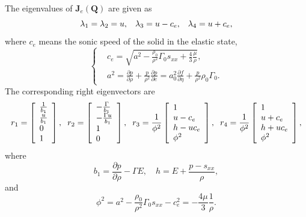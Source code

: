\documentclass{article}
\numberwithin{equation}{section}
\numberwithin{table}{section}
\begin{document}
The eigenvalues of $\mathbf{J}_{e}(\mathbf{Q})$ are given as
\begin{equation}
  \lambda_1 =\lambda_2 = u, \hspace{0.3cm} \lambda_3 = u-c_{e}, \hspace{0.3cm} \lambda_4 = u+c_{e},
\end{equation}
where $c_e$ means the sonic speed of the solid in the elastic state,
\begin{equation}\label{eq:c_e}
  \left\{ \begin{aligned}
      & c_e = \sqrt{a^2-\frac{\rho_0}{\rho^2}\Gamma_0 s_{xx} +\frac{4}{3}\frac{\mu}{\rho}},\\
    &   a^2 = \frac{\partial p}{\partial \rho} + \frac{p}{\rho^2}\frac{\partial p}{\partial e} = a^2_0 \frac{\partial f}{\partial \eta} + \frac{p}{\rho^2}\rho_0 \Gamma_0.
      \end{aligned} \right.
    \end{equation}
The corresponding right eigenvectors are
\begin{equation}\label{eq:eiv}
  r_1 = \left[ \begin{array}{l}
      \frac{1}{b_1} \\
      \frac{u}{b_1} \\
      0 \\
      1 \\
    \end{array}
    \right], \hspace{0.2cm}
    r_2= \left[ \begin{array}{l}
        -\frac{\Gamma}{b_1} \\
        -\frac{\Gamma u}{b_1} \\
        1 \\
        0\\
      \end{array}
    \right], \hspace{0.2cm}
r_3 =   \frac{1}{\phi^2}\left[\begin{array}{l}
        1 \\
        u-c_e \\
        h -uc_e \\
        \phi^2
      \end{array}
    \right], \hspace{0.2cm}
r_4 = \frac{1}{\phi^2}\left[\begin{array}{l}
        1 \\
        u+c_e \\
        h +uc_e \\
        \phi^2
      \end{array}
    \right],
  \end{equation}
  where
  \begin{equation}
    b_1 = \frac{\partial p}{\partial \rho} - \Gamma E,  \quad h = E +\frac{p-s_{xx}}{\rho},
  \end{equation}
  and
  \begin{equation}
    \phi^2 = a^2 -\frac{\rho_0}{\rho^2} \Gamma_0 s_{xx}-c_e^2 = -\frac{4\mu}{3}\frac{1}{\rho}.
  \end{equation}
\end{document}
